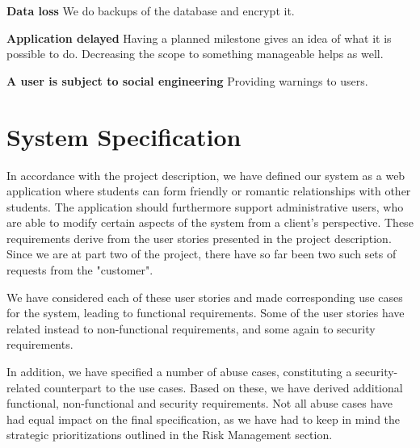 \documentclass[a4paper]{article}
\begin{document}
\textbf{Data loss}
We do backups of the database and encrypt it.

\textbf{Application delayed}
Having a planned milestone gives an idea of what it is possible to do.
Decreasing the scope to something manageable helps as well.

\textbf{A user is subject to social engineering}
Providing warnings to users.


\section{System Specification}
In accordance with the project description, we have defined our system as a web application where students can form friendly or romantic relationships with other students. The application should furthermore support administrative users, who are able to modify certain aspects of the system from a client's perspective. These requirements derive from the user stories presented in the project description. Since we are at part two of the project, there have so far been two such sets of requests from the "customer".

We have considered each of these user stories and made corresponding use cases for the system, leading to functional requirements. Some of the user stories have related instead to non-functional requirements, and some again to security requirements.

In addition, we have specified a number of abuse cases, constituting a security-related counterpart to the use cases. Based on these, we have derived additional functional, non-functional and security requirements. Not all abuse cases have had equal impact on the final specification, as we have had to keep in mind the strategic prioritizations outlined in the Risk Management section.
\end{document}
